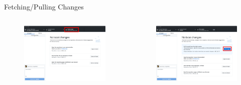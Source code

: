 \documentclass{beamer}
\begin{document}
    \begin{frame}{Fetching/Pulling Changes}
        \begin{columns}
            \begin{figure}
                \centering
                \includegraphics[width=\textwidth]{figures/pull_1.png}
            \end{figure}

            \begin{figure}
                \centering
                \includegraphics[width=\textwidth]{figures/pull_2.png}
            \end{figure}
        \end{columns}
    \end{frame}
\end{document}
